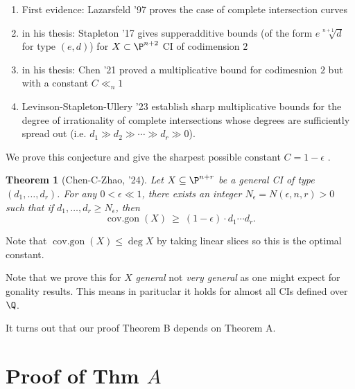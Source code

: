 \documentclass[12pt]{article}
\theoremstyle{plain}
\newtheorem{Lthm}{Theorem}
\DeclareMathOperator{\cg}{cov.gon}
\DeclareMathOperator{\covgon}{cov.gon}
\begin{document}
\begin{enumerate}
\item First evidence: Lazarsfeld '97 proves the case of complete intersection curves
\item in his thesis: Stapleton '17 gives supperadditive bounds (of the form $e \sqrt[n+1]{d}$ for type $(e,d)$) for $X \subset \P^{n+2}$ CI of codimension $2$ 
\item in his thesis: Chen '21 proved a multiplicative bound for codimesnion $2$ but with a constant $C \ll_n 1$
\item Levinson-Stapleton-Ullery '23 establish sharp multiplicative bounds for the degree of irrationality of complete intersections whose degrees are sufficiently spread out (i.e. $d_1\gg d_2\gg\cdots\gg d_r\gg0$).
\end{enumerate}

{\color{red} We prove this conjecture and give the sharpest possible constant $C = 1 - \epsilon$ .}

\begin{Lthm}[Chen-C-Zhao, '24]
Let $X \subseteq \P^{n+r}$ be a general CI of type $(d_1, \dots, d_r)$. For any $0 < \epsilon \ll 1$, there exists an integer $N_{\epsilon} = N(\epsilon, n, r) > 0$ such that if $d_1, \dots, d_r \ge N_\epsilon$, then
\[ \cg(X) \ \geq \  (1-\epsilon) \cdot d_{1} \cdots d_{r}. \]
\end{Lthm}

\begin{rmk}
Note that $\covgon(X) \le \deg{X}$ by taking linear slices so this is the optimal constant.
\end{rmk}

\begin{rmk}
Note that we prove this for $X$ \textit{general} not \textit{very general} as one might expect for gonality results. This means in parituclar it holds for almost all CIs defined over $\Q$. 
\end{rmk}

{\color{red} It turns out that our proof Theorem B depends on Theorem A. }

\section{Proof of Thm $A$}
\end{document}
